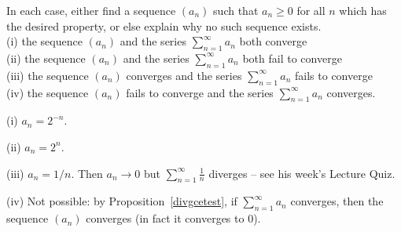\documentclass[11pt,dvipsnames]{book}
\numberwithin{equation}{section} %
\numberwithin{figure}{section} %
\numberwithin{table}{section} %
\begin{document}
%
%
%
%
%
%
%
\begin{exercise}\label{eleven}
In each case, either find a sequence $(a_n)$ such that $a_n \geq 0$ for all $n$ which has the desired property, or else explain why no such sequence exists. \\

(i) the sequence $(a_n)$ and the series $\sum_{n=1}^\infty a_n$ both converge\\

(ii) the sequence $(a_n)$ and the series $\sum_{n=1}^\infty a_n$ both fail to converge\\

(iii) the sequence $(a_n)$ converges and the series $\sum_{n=1}^\infty a_n$ fails to converge\\ 

(iv) the sequence $(a_n)$ fails to converge and the series $\sum_{n=1}^\infty a_n$ converges.\\

\begin{solution}
(i) $a_n = 2^{-n}$.

(ii) $a_n = 2^n$.

(iii) $a_n = 1/n$. Then $a_n \to 0$ but $\sum_{n=1}^\infty \frac{1}{n}$ diverges -- see his week's Lecture Quiz.

(iv) Not possible: by Proposition~\ref{divgcetest}, if $\sum_{n=1}^\infty a_n$ converges, then the sequence $(a_n)$ converges (in fact it converges to $0$).
\end{solution}

\end{exercise}
\end{document}
